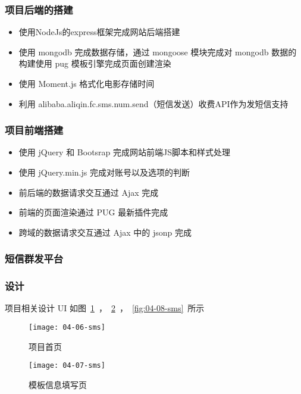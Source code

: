\subsubsection*{项目后端的搭建}
\begin{itemize}
  \item 使用NodeJs\cite{wilson2018node}的express\cite{mardan2014express}框架完成网站后端搭建
  \item 使用 mongodb 完成数据存储，通过 mongoose 模块完成对 mongodb 数据的构建使用 pug 模板引擎完成页面创建渲染
  \item 使用 Moment.js 格式化电影存储时间
  \item 利用 alibaba.aliqin.fc.sms.num.send（短信发送）收费API作为发短信支持
\end{itemize}

\subsubsection*{项目前端搭建}

\begin{itemize}
  \item 使用 jQuery 和 Bootsrap 完成网站前端JS脚本和样式处理
  \item 使用 jQuery.min.js 完成对账号以及选项的判断
  \item 前后端的数据请求交互通过 Ajax 完成
  \item 前端的页面渲染通过 PUG 最新插件完成
  \item 跨域的数据请求交互通过 Ajax 中的 jsonp 完成
\end{itemize}

\subsubsection{短信群发平台}

\subsubsection*{设计}

项目相关设计 UI 如图~\ref{fig:04-06-sms}~，~\ref{fig:04-07-sms}~，~\ref{fig:04-08-sms}~所示

\begin{figure}[htbp]
\centering
\texttt{[image: 04-06-sms]}
\caption{项目首页}
\label{fig:04-06-sms}
\end{figure}

\begin{figure}[htbp]
\centering
\texttt{[image: 04-07-sms]}
\caption{模板信息填写页}
\label{fig:04-07-sms}
\end{figure}

